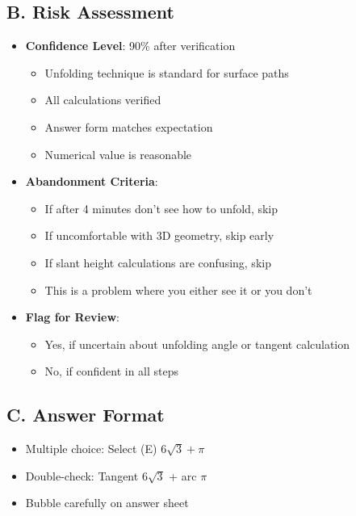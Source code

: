 \documentclass[12pt]{article}
\begin{document}
\begin{competitionbox}
\subsection*{B. Risk Assessment}
\begin{itemize}[leftmargin=*]
    \item \textbf{Confidence Level}: 90\% after verification
    \begin{itemize}
        \item Unfolding technique is standard for surface paths
        \item All calculations verified
        \item Answer form matches expectation
        \item Numerical value is reasonable
    \end{itemize}
    \item \textbf{Abandonment Criteria}: 
    \begin{itemize}
        \item If after 4 minutes don't see how to unfold, skip
        \item If uncomfortable with 3D geometry, skip early
        \item If slant height calculations are confusing, skip
        \item This is a problem where you either see it or you don't
    \end{itemize}
    \item \textbf{Flag for Review}: 
    \begin{itemize}
        \item Yes, if uncertain about unfolding angle or tangent calculation
        \item No, if confident in all steps
    \end{itemize}
\end{itemize}

\subsection*{C. Answer Format}
\begin{itemize}[leftmargin=*]
    \item Multiple choice: Select (E) $6\sqrt{3} + \pi$
    \item Double-check: Tangent $6\sqrt{3}$ + arc $\pi$ \checkmark
    \item Bubble carefully on answer sheet
\end{itemize}
\end{competitionbox}
\end{document}
